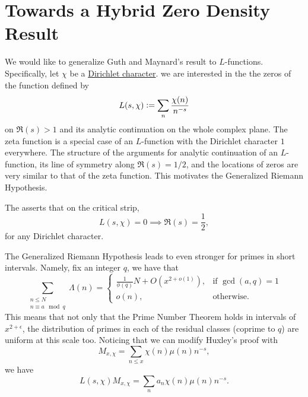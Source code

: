 \chapter{Towards a Hybrid Zero Density Result}
\iffalse

\textit{Here I will document some progress with working with
the hybrid version of Guth-Maynard. This section will be removed when I send the draft to Prof. Wunsch.}
\fi
We would like to generalize Guth and Maynard's result to $L$-functions. Specifically, let $\chi$ be a \hyperref[dcharacter]{Dirichlet character}. we are interested in the the zeros of the function defined by \[
L(s,\chi)\mathrel{\mathop:}=\sum_{n} \frac{\chi(n)}{n^{-s}}
\]
on $\Re(s)>1$ and its analytic continuation on the whole complex plane. The zeta function is a special case of an $L$-function with the Dirichlet character $1$ everywhere. The structure of the arguments for analytic continuation of an $L$-function, its line of symmetry along $\Re(s) = 1/2$, and the locations of zeros are very similar to that of the zeta function. This motivates the Generalized Riemann Hypothesis. \begin{conjecture} 
    The  asserts that on the critical strip, \[
    L(s,\chi)=0 \implies \Re(s)=\frac{1}{2},
    \]
    for any Dirichlet character.
\end{conjecture}
The Generalized Riemann Hypothesis leads to even stronger for primes in short intervals. Namely, fix an integer $q$, we have that \[
\sum_{\substack{n\leq N\\ n\equiv a\mod q}}\Lambda(n) = \begin{cases}
    \frac{1}{\phi(q)} N + O(x^{2+o(1)}), & \textrm{if $\gcd(a,q)=1$}\\
    o(n),& \textrm{otherwise.}
\end{cases}
\]
This means that not only that the Prime Number Theorem holds in intervals of $x^{2+\epsilon}$, the distribution of primes in each of the residual classes (coprime to $q$) are uniform at this scale too. Noticing that we can modify Huxley's proof with \[
M_{x,\chi} = \sum_{n\leq x} \chi(n) \mu(n) n^{-s},
\]
we have \[
L(s,\chi)M_{x,\chi} = \sum_{n} a_n \chi(n) \mu(n) n^{-s}.
\]


